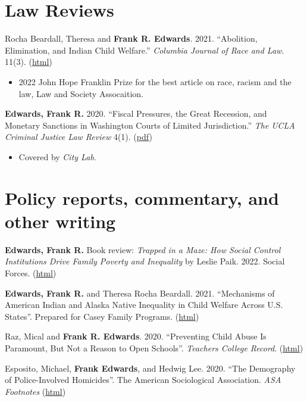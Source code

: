 \documentclass[margin,line]{res}
\begin{document}
\begin{resume}
\section{\sc Law Reviews}

Rocha Beardall, Theresa and \textbf{Frank R. Edwards}. 2021. ``Abolition, Elimination, and Indian Child Welfare.'' \textit{Columbia Journal of Race and Law}. 11(3). (\href{https://osf.io/preprints/socarxiv/mqgtc/}{html})

\begin{itemize}
  \item 2022 John Hope Franklin Prize for the best article on race, racism and the law, Law and Society Assocaition.
\end{itemize}

\textbf{Edwards, Frank R.} 2020. ``Fiscal Pressures, the Great Recession, and Monetary Sanctions in Washington Courts of Limited Jurisdiction.'' \textit{The UCLA Criminal Justice Law Review} 4(1). (\href{https://escholarship.org/content/qt8h95m64x/qt8h95m64x.pdf}{pdf})

\begin{itemize}
\item Covered by \textit{City Lab}.
\end{itemize}

\section{\sc Policy reports, commentary, and other writing}

\textbf{Edwards, Frank R.} Book review: \textit{Trapped in a Maze: How Social Control Institutions Drive Family Poverty and Inequality} by Leslie Paik. 2022. Social Forces. (\href{https://academic.oup.com/sf/advance-article-abstract/doi/10.1093/sf/soac024/6551084}{html})

\textbf{Edwards, Frank R.} and Theresa Rocha Beardall. 2021. ``Mechanisms of American Indian and Alaska Native Inequality in Child Welfare Across U.S. States''. Prepared for Casey Family Programs. (\href{https://osf.io/preprints/socarxiv/fcz5p/}{html})

Raz, Mical and \textbf{Frank R. Edwards}. 2020. ``Preventing Child Abuse Is Paramount, But Not a Reason to Open Schools''. \textit{Teachers College Record}. (\href{https://www.tcrecord.org/Content.asp?ContentID=23431}{html})

Esposito, Michael, \textbf{Frank Edwards}, and Hedwig Lee. 2020. ``The Demography of Police-Involved Homicides''. The American Sociological Association. \textit{ASA Footnotes} (\href{https://www.asanet.org/news-events/footnotes/jul-aug-2020/features/demography-police-involved-homicides}{html})


\end{resume}
\end{document}
